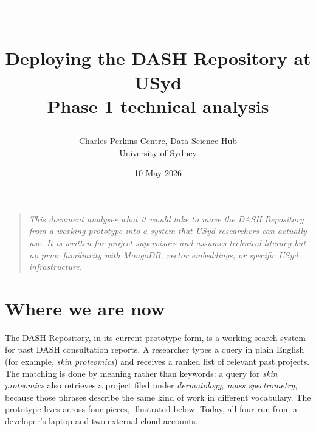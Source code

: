 \documentclass[11pt,a4paper]{article}
\title{\vspace{-2cm}\textcolor{usydred}{\rule{\textwidth}{4pt}}\\[1em]
\Huge\bfseries Deploying the DASH Repository at USyd\\[0.4em]
\large\mdseries\color{mutedtext} Phase 1 technical analysis}
\author{\small Charles Perkins Centre, Data Science Hub \\ \small University of Sydney}
\date{10 May 2026}
\begin{document}
\maketitle
\thispagestyle{empty}
\vspace{1em}

\begin{quote}
\itshape\color{mutedtext}\small
This document analyses what it would take to move the DASH Repository from a working prototype into a system that USyd researchers can actually use. It is written for project supervisors and assumes technical literacy but no prior familiarity with MongoDB, vector embeddings, or specific USyd infrastructure.
\end{quote}

\vspace{1em}

\section{Where we are now}

The DASH Repository, in its current prototype form, is a working search system for past DASH consultation reports. A researcher types a query in plain English (for example, \emph{skin proteomics}) and receives a ranked list of relevant past projects. The matching is done by meaning rather than keywords: a query for \emph{skin proteomics} also retrieves a project filed under \emph{dermatology, mass spectrometry}, because those phrases describe the same kind of work in different vocabulary. The prototype lives across four pieces, illustrated below. Today, all four run from a developer's laptop and two external cloud accounts.

\medskip
\end{document}
